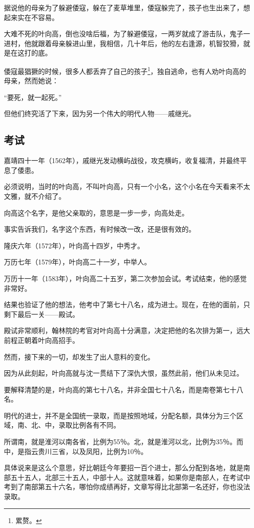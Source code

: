 \begin{multicols}{\theparacolNo}
		据说他的母亲为了躲避倭寇，躲在了麦草堆里，倭寇躲完了，孩子也生出来了，想起来实在不容易。

		大难不死的叶向高，倒也没啥后福，为了躲避倭寇，一两岁就成了游击队，鬼子一进村，他就跟着母亲躲进山里，我相信，几十年后，他的左右逢源，机智狡猾，就是在这打的底。

		倭寇最猖獗的时候，很多人都丢弃了自己的孩子\footnote{累赘。}，独自逃命，也有人劝叶向高的母亲，然而她说：

		“要死，就一起死。”

		但他们终究活了下来，因为另一个伟大的明代人物——戚继光。

		\subsection{考试}
		嘉靖四十一年（1562年），戚继光发动横屿战役，攻克横屿，收复福清，并最终平息了倭患。

		必须说明，当时的叶向高，不叫叶向高，只有一个小名，这个小名在今天看来不太文雅，就不介绍了。

		向高这个名字，是他父亲取的，意思是一步一步，向高处走。

		事实告诉我们，名字这个东西，有时候改一改，还是很有效的。

		隆庆六年（1572年），叶向高十四岁，中秀才。

		万历七年（1579年），叶向高二十一岁，中举人。

		万历十一年（1583年），叶向高二十五岁，第二次参加会试。考试结束，他的感觉非常好。

		结果也验证了他的想法，他考中了第七十八名，成为进士。现在，在他的面前，只剩下最后一关——殿试。

		殿试非常顺利，翰林院的考官对叶向高十分满意，决定把他的名次排为第一，远大前程正朝着叶向高招手。

		然而，接下来的一切，却发生了出人意料的变化。

		因为从此刻起，叶向高就与沈一贯结下了深仇大恨，虽然此前，他们从未见过。

		要解释清楚的是，叶向高的第七十八名，并非全国七十八名，而是南卷第七十八名。

		明代的进士，并不是全国统一录取，而是按照地域，分配名额，具体分为三个区域，南、北、中，录取比例各有不同。

		所谓南，就是淮河以南各省，比例为55％。北，就是淮河以北，比例为35％。而中，是指云贵川三省，以及凤阳，比例为10％。

		具体说来是这么个意思，好比朝廷今年要招一百个进士，那么分配到各地，就是南部五十五人，北部三十五人，中部十人。这就意味着，如果你是南部人，在考试中考到了南部第五十六名，哪怕你成绩再好，文章写得比北部第一名还好，你也没法录取。


\end{multicols}
